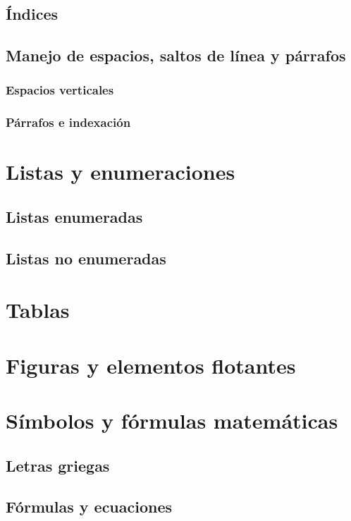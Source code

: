 \documentclass{article}
\begin{document}
\subsection{Índices}

\subsection{Manejo de espacios, saltos de línea y párrafos}

\subsubsection{Espacios verticales}

\subsubsection{Párrafos e indexación}

\section{Listas y enumeraciones}

\subsection{Listas enumeradas}

\subsection{Listas no enumeradas}

\section{Tablas}

\section{Figuras y elementos flotantes}
\clearpage
\section{Símbolos y fórmulas matemáticas}

\subsection{Letras griegas}

\subsection{Fórmulas y ecuaciones}
\end{document}
